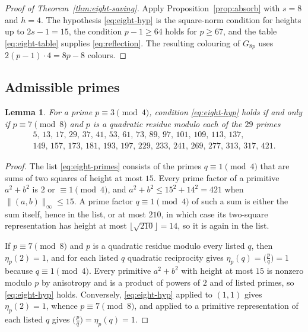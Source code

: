 \documentclass[11pt]{article}
\newtheorem{lemma}[theorem]{Lemma}
\theoremstyle{definition}
\theoremstyle{remark}
\newcommand{\qc}{\eta_p}
\newcommand{\height}[1]{\lVert #1\rVert_\infty}
\renewcommand{\ge}{\geqslant}
\renewcommand{\le}{\leqslant}
\begin{document}
\begin{proof}[Proof of Theorem~\ref{thm:eight-saving}]
Apply Proposition~\ref{prop:absorb} with \(s=8\) and \(h=4\).  The
hypothesis \eqref{eq:eight-hyp} is the square-norm condition for heights
up to \(2s-1=15\), the condition \(p-1\ge64\) holds for \(p\ge67\), and
the table \eqref{eq:eight-table} supplies \eqref{eq:reflection}.  The
resulting colouring of \(G_{8p}\) uses \(2(p-1)\cdot4=8p-8\) colours.
\end{proof}

\subsection{Admissible primes}
\label{sec:eight-admissible}

\begin{lemma}\label{lem:eight-admissible}
For a prime \(p\equiv3\pmod4\), condition \eqref{eq:eight-hyp} holds if
and only if \(p\equiv7\pmod8\) and \(p\) is a quadratic residue modulo
each of the \(29\) primes
\begin{equation}\label{eq:eight-primes}
\begin{gathered}
5,\,13,\,17,\,29,\,37,\,41,\,53,\,61,\,73,\,89,\,97,\,101,\,109,\,113,\,137,\\
149,\,157,\,173,\,181,\,193,\,197,\,229,\,233,\,241,\,269,\,277,\,313,\,317,\,421.
\end{gathered}
\end{equation}
\end{lemma}

\begin{proof}
The list \eqref{eq:eight-primes} consists of the primes
\(q\equiv1\pmod4\) that are sums of two squares of height at most
\(15\).  Every prime factor of a primitive \(a^2+b^2\) is \(2\) or
\(\equiv1\pmod4\), and \(a^2+b^2\le15^2+14^2=421\) when
\(\height{(a,b)}\le15\).  A prime factor \(q\equiv1\pmod4\) of such a
sum is either the sum itself, hence in the list, or at most \(210\), in
which case its two-square representation has height at most
\(\lfloor\sqrt{210}\rfloor=14\), so it is again in the list.

If \(p\equiv7\pmod8\) and \(p\) is a quadratic residue modulo every
listed \(q\), then \(\qc(2)=1\), and for each listed \(q\) quadratic
reciprocity gives \(\qc(q)=\bigl(\tfrac{p}{q}\bigr)=1\) because
\(q\equiv1\pmod4\).  Every primitive \(a^2+b^2\) with height at most
\(15\) is nonzero modulo \(p\) by anisotropy and is a product of powers
of \(2\) and of listed primes, so \eqref{eq:eight-hyp} holds.
Conversely, \eqref{eq:eight-hyp} applied to \((1,1)\) gives \(\qc(2)=1\),
whence \(p\equiv7\pmod8\), and applied to a primitive representation of
each listed \(q\) gives \(\bigl(\tfrac{p}{q}\bigr)=\qc(q)=1\).
\end{proof}
\end{document}
